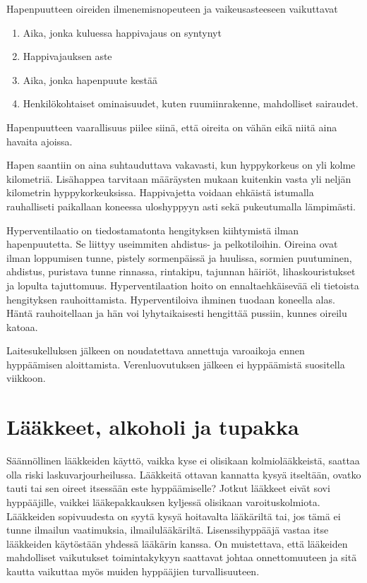 Hapenpuutteen oireiden ilmenemisnopeuteen ja vaikeusasteeseen vaikuttavat 

\begin{enumerate}[label=\bfseries \arabic*)]
\item  Aika, jonka kuluessa happivajaus on syntynyt 
\item  Happivajauksen aste 
\item  Aika, jonka hapenpuute kestää  
\item  Henkilökohtaiset ominaisuudet, kuten ruumiinrakenne, mahdolliset sairaudet. 
\end{enumerate}

Hapenpuutteen vaarallisuus piilee siinä, että oireita on vähän eikä niitä aina havaita ajoissa. 


Hapen saantiin on aina suhtauduttava vakavasti, kun hyppykorkeus on yli kolme kilometriä. Lisähappea tarvitaan määräysten mukaan kuitenkin vasta yli neljän kilometrin hyppykorkeuksissa. Happivajetta voidaan ehkäistä istumalla rauhalliseti paikallaan koneessa uloshyppyyn asti sekä pukeutumalla lämpimästi. 


Hyperventilaatio on tiedostamatonta hengityksen kiihtymistä ilman hapenpuutetta. Se liittyy useimmiten ahdistus- ja pelkotiloihin. Oireina ovat ilman loppumisen tunne, pistely sormenpäissä ja huulissa, sormien puutuminen, ahdistus, puristava tunne rinnassa, rintakipu, tajunnan häiriöt, lihaskouristukset ja lopulta tajuttomuus. Hyperventilaation hoito on ennaltaehkäisevää eli tietoista hengityksen rauhoittamista. Hyperventiloiva ihminen tuodaan koneella alas. Häntä rauhoitellaan ja hän voi lyhytaikaisesti hengittää pussiin, kunnes oireilu katoaa.  


Laitesukelluksen jälkeen on noudatettava annettuja varoaikoja ennen hyppäämisen aloittamista. Verenluovutuksen jälkeen ei hyppäämistä suositella viikkoon. 

\section{ Lääkkeet, alkoholi ja tupakka }
\label{fysiologia-laakkeet-alkoholi-ja-tupakka}


Säännöllinen lääkkeiden käyttö, vaikka kyse ei olisikaan kolmiolääkkeistä, saattaa olla riski laskuvarjourheilussa. Lääkkeitä ottavan kannatta kysyä itseltään, ovatko tauti tai sen oireet itsessään este hyppäämiselle? Jotkut lääkkeet eivät sovi hyppääjille, vaikkei lääkepakkauksen kyljessä olisikaan varoituskolmiota. Lääkkeiden sopivuudesta on syytä kysyä hoitavalta lääkäriltä tai, jos tämä ei tunne ilmailun vaatimuksia, ilmailulääkäriltä. Lisenssihyppääjä vastaa itse lääkkeiden käytöstään yhdessä lääkärin kanssa. On muistettava, että lääkeiden mahdolliset vaikutukset toimintakykyyn saattavat johtaa onnettomuuteen ja sitä kautta vaikuttaa myös muiden hyppääjien turvallisuuteen. 


